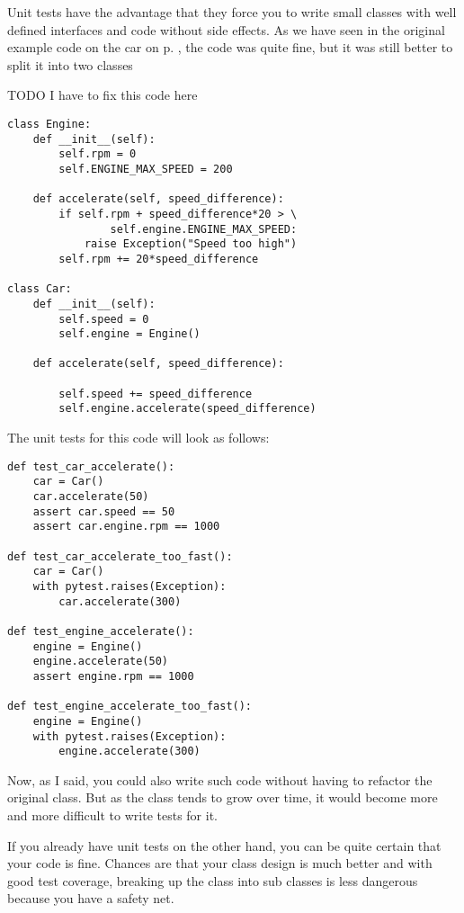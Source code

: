 Unit tests have the advantage that they force you to write small classes with well defined interfaces and code without side effects. As we have seen in the original example code on the car on p. \pageref{prog:car}, the code was quite fine, but it was still better to split it into two classes

TODO I have to fix this code here
\begin{programcode}{}
\begin{verbatim}
class Engine:
    def __init__(self):
        self.rpm = 0
        self.ENGINE_MAX_SPEED = 200

    def accelerate(self, speed_difference):
        if self.rpm + speed_difference*20 > \
                self.engine.ENGINE_MAX_SPEED:
            raise Exception("Speed too high")
        self.rpm += 20*speed_difference

class Car:
    def __init__(self):
        self.speed = 0
        self.engine = Engine()
        
    def accelerate(self, speed_difference):
        
        self.speed += speed_difference
        self.engine.accelerate(speed_difference)
\end{verbatim}
\end{programcode}

The unit tests for this code will look as follows:

\begin{programcode}{}
\begin{verbatim}
def test_car_accelerate():
    car = Car()
    car.accelerate(50)
    assert car.speed == 50
    assert car.engine.rpm == 1000

def test_car_accelerate_too_fast():
    car = Car()
    with pytest.raises(Exception):
        car.accelerate(300)

def test_engine_accelerate():
    engine = Engine()
    engine.accelerate(50)
    assert engine.rpm == 1000

def test_engine_accelerate_too_fast():
    engine = Engine()
    with pytest.raises(Exception):
        engine.accelerate(300)
\end{verbatim}
\end{programcode}

Now, as I said, you could also write such code without having to refactor the original  class. But as the class tends to grow over time, it would become more and more difficult to write tests for it.

If you already have unit tests on the other hand, you can be quite certain that your code is fine. Chances are that your class design is much better and with good test coverage, breaking up the  class into sub classes is less dangerous because you have a safety net.

